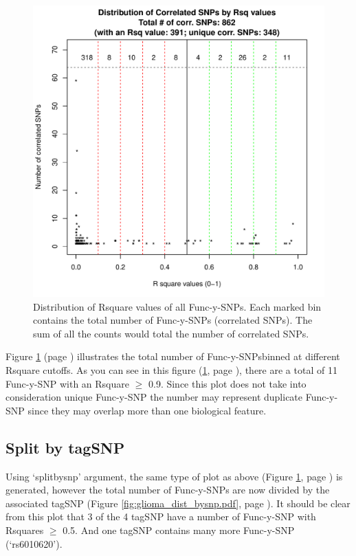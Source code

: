 \documentclass[12pt,fullpage]{article}
\begin{document}
\begin{figure}[ht!]
\begin{center}
\includegraphics{glioma_dist.pdf}
\caption{\label{fig:glioma_dist.pdf} Distribution of Rsquare values of all 
Func-y-SNPs. Each marked bin contains the total number of Func-y-SNPs
(correlated SNPs). The sum of all the counts would total the number of
correlated SNPs.}
{\footnotesize{}}
\end{center}
\end{figure}

Figure \ref{fig:glioma_dist.pdf} (page \pageref{fig:glioma_dist.pdf})
illustrates the total number of Func-y-SNPsbinned at different Rsquare cutoffs.
As you can see in this figure (\ref{fig:glioma_dist.pdf}, page
        \pageref{fig:glioma_dist.pdf}), there are a total of 11 Func-y-SNP with
an Rsquare $\ge$ 0.9. Since this plot does not take into consideration unique
Func-y-SNP the number may represent duplicate Func-y-SNP since they may overlap
more than one biological feature.

\subsection{Split by tagSNP}

Using `splitbysnp' argument, the same type of plot as above (Figure
\ref{fig:glioma_dist.pdf}, page \pageref{fig:glioma_dist.pdf}) is generated,
      however the total number of Func-y-SNPs are now divided by the associated
      tagSNP (Figure \ref{fig:glioma_dist_bysnp.pdf}, page
              \pageref{fig:glioma_dist_bysnp.pdf}). It should be clear from this
      plot that 3 of the 4 tagSNP have a number of Func-y-SNP with Rsquares
      $\ge$ 0.5.  And one tagSNP contains many more Func-y-SNP (`rs6010620').
\end{document}
